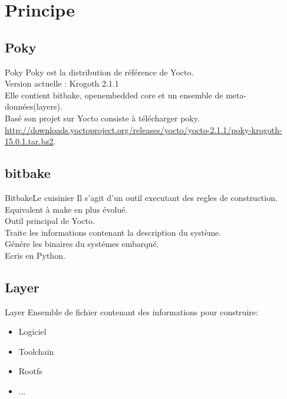 \section{Principe}

\subsection{Poky}
\begin{frame}{Poky}{}
	Poky est la distribution de référence de Yocto.\\
	Version actuelle : Krogoth 2.1.1\\
	Elle contient bitbake, openembedded core et un ensemble de meta-données(layers).\\
	Basé son projet sur Yocto consiste à télécharger poky.\\
	\url{http://downloads.yoctoproject.org/releases/yocto/yocto-2.1.1/poky-krogoth-15.0.1.tar.bz2}.\\
\end{frame}

\subsection{bitbake}
\begin{frame}{Bitbake}{Le cuisinier}
	Il s'agit d'un outil executant des regles de construction.\\
	Equivalent à make en plus évolué.\\
	Outil principal de Yocto.\\
	Traite les informations contenant la description du système.\\
	Génére les binaires du systémes embarqué.\\
	Ecris en Python.\\
\end{frame}

\subsection{Layer}
\begin{frame}{Layer}{}
	Ensemble de fichier contenant des informations pour construire:
	\begin{itemize}
		\item
			Logiciel
		\item
			Toolchain
		\item
			Rootfs
		\item
			...
	\end{itemize}
	
\end{frame}

